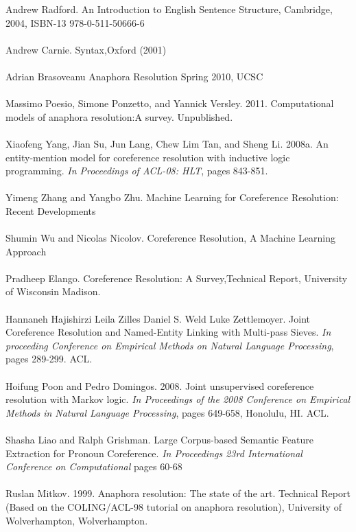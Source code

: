 \big[28\big] Andrew Radford. An Introduction to English Sentence Structure, Cambridge, 2004, ISBN-13 978-0-511-50666-6 \\  \\
\big[29\big] Andrew Carnie. Syntax,Oxford (2001)\\  \\
\big[30\big] Adrian Brasoveanu Anaphora Resolution Spring 2010, UCSC \\  \\
\big[31\big] Massimo Poesio, Simone Ponzetto, and Yannick Versley. 2011. Computational models of anaphora resolution:A survey. Unpublished. \\  \\
\big[32\big] Xiaofeng Yang, Jian Su, Jun Lang, Chew Lim Tan, and Sheng Li. 2008a. An entity-mention model for coreference resolution with inductive logic programming. \emph{In Proceedings of ACL-08: HLT}, pages 843-851.\\  \\
\big[33\big] Yimeng Zhang and  Yangbo Zhu. Machine Learning for Coreference Resolution: Recent Developments \\  \\
\big[34\big] Shumin Wu and Nicolas Nicolov. Coreference Resolution, A Machine Learning Approach  \\  \\
\big[35\big] Pradheep Elango. Coreference Resolution: A Survey,Technical Report, University of Wisconsin Madison.  \\  \\
\big[36\big] Hannaneh Hajishirzi Leila Zilles Daniel S. Weld Luke Zettlemoyer. Joint Coreference Resolution and Named-Entity Linking with Multi-pass Sieves.   \emph{In proceeding Conference on Empirical Methods on Natural Language Processing}, pages 289-299. ACL. \\  \\
\big[37\big] Hoifung Poon and Pedro Domingos. 2008. Joint unsupervised coreference resolution with Markov logic. \emph{In Proceedings of the 2008 Conference on Empirical Methods in Natural Language Processing}, pages 649-658, Honolulu, HI. ACL. \\  \\
\big[38\big] Shasha Liao and Ralph Grishman. Large Corpus-based Semantic Feature Extraction for Pronoun Coreference. \emph{ In Proceedings 23rd International Conference on Computational}  pages 60-68 \\  \\
\big[39\big] Ruslan Mitkov. 1999. Anaphora resolution: The state of the art. Technical Report (Based on the COLING/ACL-98 tutorial on anaphora resolution), University of Wolverhampton, Wolverhampton. \\  \\
